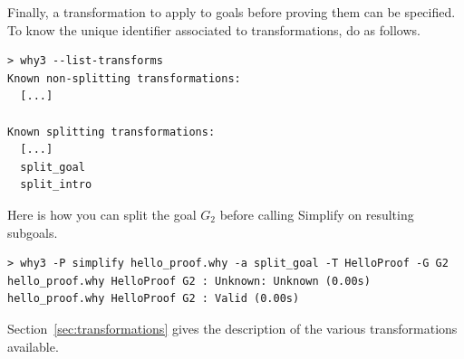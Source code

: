 Finally, a transformation to apply to goals before proving them can be
specified. To know the unique identifier associated to transformations, do as follows.
\begin{verbatim}
> why3 --list-transforms
Known non-splitting transformations:
  [...]

Known splitting transformations:
  [...]
  split_goal
  split_intro
\end{verbatim}
Here is how you can split the goal $G_2$ before calling
Simplify on resulting subgoals.
\begin{verbatim}
> why3 -P simplify hello_proof.why -a split_goal -T HelloProof -G G2
hello_proof.why HelloProof G2 : Unknown: Unknown (0.00s)
hello_proof.why HelloProof G2 : Valid (0.00s)
\end{verbatim}
Section~\ref{sec:transformations} gives the description of the various
transformations available.



